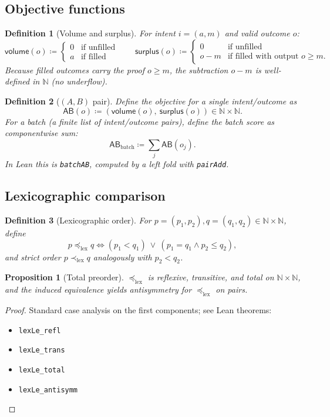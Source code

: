 \documentclass[11pt]{article}
\newtheorem{definition}{Definition}
\newtheorem{proposition}{Proposition}
\theoremstyle{remark}
\newcommand{\N}{\mathbb{N}}
\begin{document}
\subsection{Objective functions}

\begin{definition}[Volume and surplus]
For intent $i=(a,m)$ and valid outcome $o$:
\[
  \mathsf{volume}(o) \coloneqq
  \begin{cases}
    0 & \text{if unfilled}\\
    a & \text{if filled}
  \end{cases}
  \qquad
  \mathsf{surplus}(o) \coloneqq
  \begin{cases}
    0 & \text{if unfilled}\\
    o - m & \text{if filled with output }o\ge m.
  \end{cases}
\]
Because filled outcomes carry the proof $o\ge m$, the subtraction $o-m$ is well-defined in $\N$
(no underflow).
\end{definition}

\begin{definition}[$(A,B)$ pair]
Define the objective for a single intent/outcome as
\[
  \mathsf{AB}(o) \coloneqq (\mathsf{volume}(o),\ \mathsf{surplus}(o)) \in \N\times\N.
\]
For a batch (a finite list of intent/outcome pairs), define the batch score as componentwise sum:
\[
  \mathsf{AB}_{\mathrm{batch}} \coloneqq \sum_j \mathsf{AB}(o_j).
\]
In Lean this is \texttt{batchAB}, computed by a left fold with \texttt{pairAdd}.
\end{definition}

\subsection{Lexicographic comparison}

\begin{definition}[Lexicographic order]
For $p=(p_1,p_2),q=(q_1,q_2)\in\N\times\N$, define
\[
  p \preceq_{\mathrm{lex}} q \iff (p_1 < q_1)\ \lor\ (p_1=q_1 \land p_2 \le q_2),
\]
and strict order $p \prec_{\mathrm{lex}} q$ analogously with $p_2<q_2$.
\end{definition}

\begin{proposition}[Total preorder]
$\preceq_{\mathrm{lex}}$ is reflexive, transitive, and total on $\N\times\N$,
and the induced equivalence yields antisymmetry for $\preceq_{\mathrm{lex}}$ on pairs.
\end{proposition}
\begin{proof}
Standard case analysis on the first components; see Lean theorems:
\begin{itemize}[leftmargin=2em]
  \item \texttt{lexLe\_refl}
  \item \texttt{lexLe\_trans}
  \item \texttt{lexLe\_total}
  \item \texttt{lexLe\_antisymm}
\end{itemize}
\end{proof}
\end{document}
